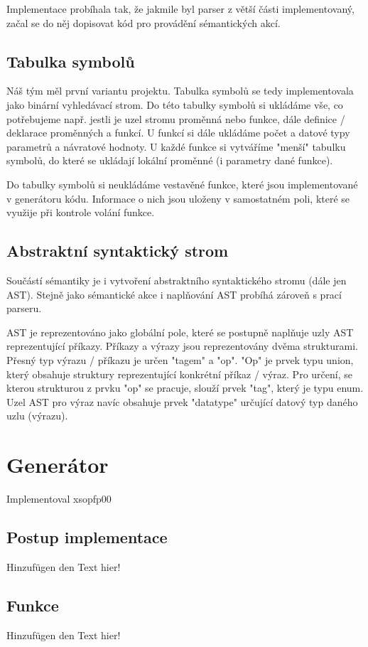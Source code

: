 \documentclass[11pt,a4paper]{article}
\begin{document}
    Implementace probíhala tak, že jakmile byl parser z větší části implementovaný, začal se do něj dopisovat kód pro provádění sémantických akcí.
    
    \subsection{Tabulka symbolů}
    Náš tým měl první variantu projektu. Tabulka symbolů se tedy implementovala jako binární vyhledávací strom. Do této tabulky symbolů si ukládáme vše, co potřebujeme např. jestli je uzel stromu proměnná nebo funkce, dále definice / deklarace proměnných a funkcí. U funkcí si dále ukládáme počet a datové typy parametrů a návratové hodnoty. U každé funkce si vytváříme "menší" tabulku symbolů, do které se ukládají lokální proměnné (i parametry dané funkce).
    
    Do tabulky symbolů si neukládáme vestavěné funkce, které jsou implementované v generátoru kódu. Informace o nich jsou uloženy v samostatném poli, které se využije při kontrole volání funkce.
    
    \subsection{Abstraktní syntaktický strom}
    Součástí sémantiky je i vytvoření abstraktního syntaktického stromu (dále jen AST). Stejně jako sémantické akce i naplňování AST probíhá zároveň s prací parseru.
    
    AST je reprezentováno jako globální pole, které se postupně naplňuje uzly AST reprezentující příkazy. Příkazy a výrazy jsou reprezentovány dvěma strukturami. Přesný typ výrazu / příkazu je určen "tagem" a "op". "Op" je prvek typu union, který obsahuje struktury reprezentující konkrétní příkaz / výraz. Pro určení, se kterou strukturou z prvku "op" se pracuje, slouží prvek "tag", který je typu enum. Uzel AST pro výraz navíc obsahuje prvek "datatype" určující datový typ daného uzlu (výrazu). \cite{AST:AST_in_C}
    
	\newpage


\section{Generátor}
    Implementoval xsopfp00

    \subsection{Postup implementace}
    \noindent Hinzufügen den Text hier!

    \subsection{Funkce}
    \noindent Hinzufügen den Text hier!

    \newpage
    
\end{document}
